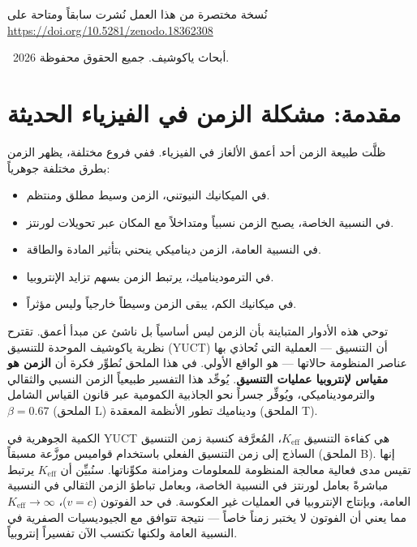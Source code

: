 \documentclass[11pt,a4paper]{article}
\newcommand{\Ke}{K_{\mathrm{eff}}}
\begin{document}
	\vspace{0.5cm}
	\noindent
	{\small نُسخة مختصرة من هذا العمل نُشرت سابقاً ومتاحة على \\ \url{https://doi.org/10.5281/zenodo.18362308}}
	\vspace{0.5cm}
	
	\noindent
	\textcopyright\ 2026 أبحاث ياكوشيف. جميع الحقوق محفوظة.
	
	\tableofcontents
	\newpage
	
	\section{مقدمة: مشكلة الزمن في الفيزياء الحديثة}
	\label{sec:intro}
	
	ظلَّت طبيعة الزمن أحد أعمق الألغاز في الفيزياء. ففي فروع مختلفة، يظهر الزمن بطرق مختلفة جوهرياً:
	\begin{itemize}
		\item في الميكانيك النيوتني، الزمن وسيط مطلق ومنتظم.
		\item في النسبية الخاصة، يصبح الزمن نسبياً ومتداخلاً مع المكان عبر تحويلات لورنتز.
		\item في النسبية العامة، الزمن ديناميكي ينحني بتأثير المادة والطاقة.
		\item في الترموديناميك، يرتبط الزمن بسهم تزايد الإنتروبيا.
		\item في ميكانيك الكم، يبقى الزمن وسيطاً خارجياً وليس مؤثراً.
	\end{itemize}
	
	توحي هذه الأدوار المتباينة بأن الزمن ليس أساسياً بل ناشئ عن مبدأ أعمق. تقترح نظرية ياكوشيف الموحدة للتنسيق (YUCT) أن التنسيق — العملية التي تُحاذي بها عناصر المنظومة حالاتها — هو الواقع الأولي. في هذا الملحق نُطوِّر فكرة أن \textbf{الزمن هو مقياس لإنتروبيا عمليات التنسيق}. يُوحِّد هذا التفسير طبيعياً الزمن النسبي والثقالي والترموديناميكي، ويُوفِّر جسراً نحو الجاذبية الكمومية عبر قانون القياس الشامل \(\beta = 0.67\) (الملحق L) وديناميك تطور الأنظمة المعقدة (الملحق T).
	
	الكمية الجوهرية في YUCT هي كفاءة التنسيق \(\Ke\)، المُعرَّفة كنسبة زمن التنسيق الساذج إلى زمن التنسيق الفعلي باستخدام قواميس موزَّعة مسبقاً (الملحق B). إنها تقيس مدى فعالية معالجة المنظومة للمعلومات ومزامنة مكوِّناتها. سنُبيِّن أن \(\Ke\) يرتبط مباشرةً بعامل لورنتز في النسبية الخاصة، وبعامل تباطؤ الزمن الثقالي في النسبية العامة، وبإنتاج الإنتروبيا في العمليات غير العكوسة. في حد الفوتون (\(v=c\))، \(\Ke \to \infty\) مما يعني أن الفوتون لا يختبر زمناً خاصاً — نتيجة تتوافق مع الجيوديسيات الصفرية في النسبية العامة ولكنها تكتسب الآن تفسيراً إنتروبياً.
	
\end{document}
